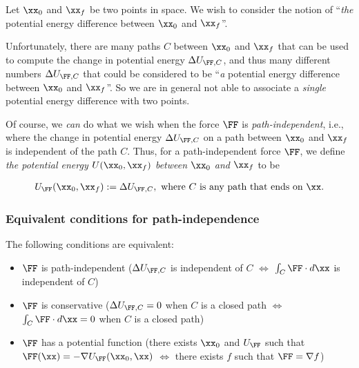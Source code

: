 \documentclass{article}
\begin{document}
Let $\xx_0$ and $\xx_f$ be two points in space. We wish to consider the notion of ``\textit{the} potential energy difference between $\xx_0$ and $\xx_f$''. 

Unfortunately, there are many paths $C$ between $\xx_0$ and $\xx_f$ that can be used to compute the change in potential energy $\Delta U_{\FF, C}$, and thus many different numbers $\Delta U_{\FF, C}$ that could be considered to be ``\textit{a} potential energy difference between $\xx_0$ and $\xx_f$''. So we are in general not able to associate a \textit{single} potential energy difference with two points.

Of course, we \textit{can} do what we wish when the force $\FF$ is \textit{path-independent}, i.e., where the change in potential energy $\Delta U_{\FF, C}$ on a path between $\xx_0$ and $\xx_f$ is independent of the path $C$. Thus, for a path-independent force $\FF$, we define \textit{the potential energy $U(\xx_0, \xx_f)$ between $\xx_0$ and $\xx_f$} to be

\begin{align*}
    U_{\FF}(\xx_0, \xx_f) := \Delta U_{\FF, C}, \text{ where $C$ is any path that ends on $\xx$}.
\end{align*}

\subsubsection*{Equivalent conditions for path-independence}

The following conditions are equivalent:

\begin{itemize}
    \item $\FF$ is path-independent ($\Delta U_{\FF, C}$ is independent of $C$ $\iff$ $\int_C \FF \cdot d\xx$ is independent of $C$)
    \item $\FF$ is conservative ($\Delta U_{\FF, C} = 0$ when $C$ is a closed path $\iff$ $\int_C \FF \cdot d\xx = 0$ when $C$ is a closed path)
    \item $\FF$ has a potential function (there exists $\xx_0$ and $U_{\FF}$ such that $\FF(\xx) = - \nabla U_{\FF}(\xx_0, \xx)$ $\iff$ there exists $f$ such that $\FF = \nabla f$)
\end{itemize}
\end{document}
